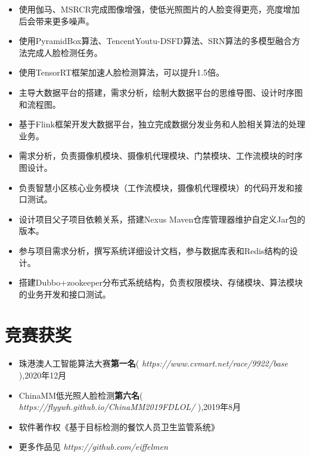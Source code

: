 \documentclass{resume}
\begin{document}
\begin{itemize}
  \item 使用伽马、MSRCR完成图像增强，使低光照图片的人脸变得更亮，亮度增加后会带来更多噪声。
  \item 使用PyramidBox算法、TencentYoutu-DSFD算法、SRN算法的多模型融合方法完成人脸检测任务。
  \item 使用TensorRT框架加速人脸检测算法，可以提升1.5倍。
\end{itemize}
\begin{itemize}
  \item 主导大数据平台的搭建，需求分析，绘制大数据平台的思维导图、设计时序图和流程图。
  \item 基于Flink框架开发大数据平台，独立完成数据分发业务和人脸相关算法的处理业务。
\end{itemize}
\begin{itemize}
  \item 需求分析，负责摄像机模块、摄像机代理模块、门禁模块、工作流模块的时序图设计。
  \item 负责智慧小区核心业务模块（工作流模块，摄像机代理模块）的代码开发和接口测试。
  \item 设计项目父子项目依赖关系，搭建Nexus Maven仓库管理器维护自定义Jar包的版本。
\end{itemize}
\begin{itemize}
  \item 参与项目需求分析，撰写系统详细设计文档，参与数据库表和Redis结构的设计。
  \item 搭建Dubbo+zookeeper分布式系统结构，负责权限模块、存储模块、算法模块的业务开发和接口测试。%
\end{itemize}


\section{竞赛获奖}
\begin{itemize}[parsep=0.2ex]
  \item 珠港澳人工智能算法大赛\textbf{第一名}( \textit{https://www.cvmart.net/race/9922/base} ),2020年12月  %
  \item ChinaMM低光照人脸检测\textbf{第六名}( \textit{https://flyywh.github.io/ChinaMM2019FDLOL/} ),2019年8月
  \item 软件著作权《基于目标检测的餐饮人员卫生监管系统》
  \item 更多作品见 \textit{https://github.com/eiffelmen}
\end{itemize}
\end{document}
